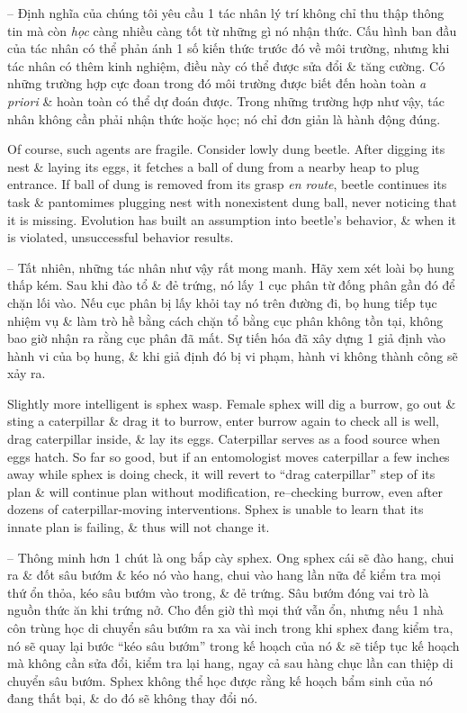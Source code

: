 \documentclass{article}
\begin{document}
\begin{itemize}
\begin{itemize}
\begin{itemize}
\begin{itemize}
				-- Định nghĩa của chúng tôi yêu cầu 1 tác nhân lý trí không chỉ thu thập thông tin mà còn {\it học} càng nhiều càng tốt từ những gì nó nhận thức. Cấu hình ban đầu của tác nhân có thể phản ánh 1 số kiến thức trước đó về môi trường, nhưng khi tác nhân có thêm kinh nghiệm, điều này có thể được sửa đổi \& tăng cường. Có những trường hợp cực đoan trong đó môi trường được biết đến hoàn toàn {\it a priori} \& hoàn toàn có thể dự đoán được. Trong những trường hợp như vậy, tác nhân không cần phải nhận thức hoặc học; nó chỉ đơn giản là hành động đúng.
				
				Of course, such agents are fragile. Consider lowly dung beetle. After digging its nest \& laying its eggs, it fetches a ball of dung from a nearby heap to plug entrance. If ball of dung is removed from its grasp {\it en route}, beetle continues its task \& pantomimes plugging nest with nonexistent dung ball, never noticing that it is missing. Evolution has built an assumption into beetle's behavior, \& when it is violated, unsuccessful behavior results.
				
				-- Tất nhiên, những tác nhân như vậy rất mong manh. Hãy xem xét loài bọ hung thấp kém. Sau khi đào tổ \& đẻ trứng, nó lấy 1 cục phân từ đống phân gần đó để chặn lối vào. Nếu cục phân bị lấy khỏi tay nó trên đường đi, bọ hung tiếp tục nhiệm vụ \& làm trò hề bằng cách chặn tổ bằng cục phân không tồn tại, không bao giờ nhận ra rằng cục phân đã mất. Sự tiến hóa đã xây dựng 1 giả định vào hành vi của bọ hung, \& khi giả định đó bị vi phạm, hành vi không thành công sẽ xảy ra.
				
				Slightly more intelligent is sphex wasp. Female sphex will dig a burrow, go out \& sting a caterpillar \& drag it to burrow, enter burrow again to check all is well, drag caterpillar inside, \& lay its eggs. Caterpillar serves as a food source when eggs hatch. So far so good, but if an entomologist moves caterpillar a few inches away while sphex is doing check, it will revert to ``drag caterpillar'' step of its plan \& will continue plan without modification, re--checking burrow, even after dozens of caterpillar-moving interventions. Sphex is unable to learn that its innate plan is failing, \& thus will not change it.
				
				-- Thông minh hơn 1 chút là ong bắp cày sphex. Ong sphex cái sẽ đào hang, chui ra \& đốt sâu bướm \& kéo nó vào hang, chui vào hang lần nữa để kiểm tra mọi thứ ổn thỏa, kéo sâu bướm vào trong, \& đẻ trứng. Sâu bướm đóng vai trò là nguồn thức ăn khi trứng nở. Cho đến giờ thì mọi thứ vẫn ổn, nhưng nếu 1 nhà côn trùng học di chuyển sâu bướm ra xa vài inch trong khi sphex đang kiểm tra, nó sẽ quay lại bước ``kéo sâu bướm'' trong kế hoạch của nó \& sẽ tiếp tục kế hoạch mà không cần sửa đổi, kiểm tra lại hang, ngay cả sau hàng chục lần can thiệp di chuyển sâu bướm. Sphex không thể học được rằng kế hoạch bẩm sinh của nó đang thất bại, \& do đó sẽ không thay đổi nó.
				

\end{itemize}
\end{itemize}
\end{itemize}
\end{itemize}
\end{document}
